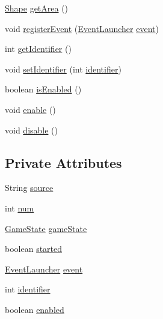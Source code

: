 \begin{DoxyCompactItemize}
\item 
\mbox{\hyperlink{classorg_1_1newdawn_1_1slick_1_1geom_1_1_shape}{Shape}} \mbox{\hyperlink{classdetectors_1_1_dialogue_location_a3417163c536b0e5ba2b362e9548da7b6}{get\+Area}} ()
\item 
void \mbox{\hyperlink{classdetectors_1_1_dialogue_location_a85184de3666785a5a0a1af29b0a0308e}{register\+Event}} (\mbox{\hyperlink{interfaceentities_1_1_event_launcher}{Event\+Launcher}} \mbox{\hyperlink{classdetectors_1_1_dialogue_location_ae8a0a0c1545951d8993d6e192edf22bd}{event}})
\item 
int \mbox{\hyperlink{classdetectors_1_1_dialogue_location_a076072001b2bba735eec60606025f9b6}{get\+Identifier}} ()
\item 
void \mbox{\hyperlink{classdetectors_1_1_dialogue_location_a6c5c259a57fd739b2274d4d259634745}{set\+Identifier}} (int \mbox{\hyperlink{classdetectors_1_1_dialogue_location_a27a2a136c8c8b9df94946afcddf90e7d}{identifier}})
\item 
boolean \mbox{\hyperlink{classdetectors_1_1_dialogue_location_a7813c3b2d0b00ae7c832fef3a2b12dfc}{is\+Enabled}} ()
\item 
void \mbox{\hyperlink{classdetectors_1_1_dialogue_location_ae5b1e547c67f1b2f61e3b2b0b5dedbc4}{enable}} ()
\item 
void \mbox{\hyperlink{classdetectors_1_1_dialogue_location_a6291ee1ebe1a42ba222707cd118ca5a7}{disable}} ()
\end{DoxyCompactItemize}
\subsection*{Private Attributes}
\begin{DoxyCompactItemize}
\item 
String \mbox{\hyperlink{classdetectors_1_1_dialogue_location_a55abbd4dc425d54ce35dfae63bd1b1e0}{source}}
\item 
int \mbox{\hyperlink{classdetectors_1_1_dialogue_location_ab19469a81933f3e7295fa59d70ac1f1b}{num}}
\item 
\mbox{\hyperlink{classstates_1_1_game_state}{Game\+State}} \mbox{\hyperlink{classdetectors_1_1_dialogue_location_a12ac7bef754e0189f746c02f7d82f5e7}{game\+State}}
\item 
boolean \mbox{\hyperlink{classdetectors_1_1_dialogue_location_a980ab73233584dd2c3f336cfea0c8662}{started}}
\item 
\mbox{\hyperlink{interfaceentities_1_1_event_launcher}{Event\+Launcher}} \mbox{\hyperlink{classdetectors_1_1_dialogue_location_ae8a0a0c1545951d8993d6e192edf22bd}{event}}
\item 
int \mbox{\hyperlink{classdetectors_1_1_dialogue_location_a27a2a136c8c8b9df94946afcddf90e7d}{identifier}}
\item 
boolean \mbox{\hyperlink{classdetectors_1_1_dialogue_location_a724e4fa1eb635dc794cc3a3fde90e947}{enabled}}
\end{DoxyCompactItemize}

